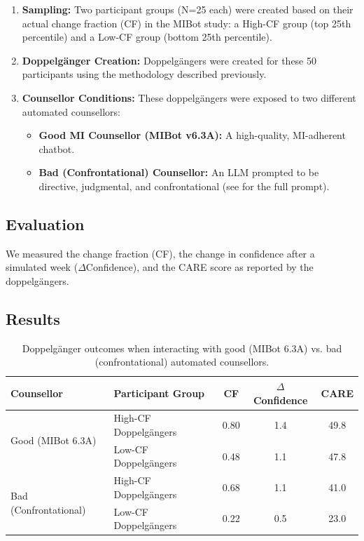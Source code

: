 \begin{enumerate}
    \item \textbf{Sampling:} Two participant groups (N=25 each) were created based on their actual change fraction (CF) in the MIBot study: a High-CF group (top 25th percentile) and a Low-CF group (bottom 25th percentile).

    \item \textbf{Doppelgänger Creation:} Doppelgängers were created for these 50 participants using the methodology described previously.
    
    \item \textbf{Counsellor Conditions:} These doppelgängers were exposed to two different automated counsellors:
    \begin{itemize}
        \item \textbf{Good MI Counsellor (MIBot v6.3A):} A high-quality, MI-adherent chatbot.
        
        \item \textbf{Bad (Confrontational) Counsellor:} An LLM prompted to be directive, judgmental, and confrontational (see  for the full prompt).
    \end{itemize}
\end{enumerate}

\subsection{Evaluation}
We measured the change fraction (CF), the change in confidence after a simulated week ($\Delta$Confidence), and the CARE score as reported by the doppelgängers.

\subsection{Results}

\begin{table}[ht!]
\centering
\begin{tabular}{@{}llccc@{}}
\toprule
\textbf{Counsellor} & \textbf{Participant Group} & \textbf{CF} & \textbf{$\Delta$Confidence} & \textbf{CARE} \\ \midrule
\multirow{2}{*}{Good (MIBot 6.3A)} & High-CF Doppelgängers & 0.80 & 1.4 & 49.8 \\
& Low-CF Doppelgängers & 0.48 & 1.1 & 47.8 \\ \midrule
\multirow{2}{*}{Bad (Confrontational)} & High-CF Doppelgängers & 0.68 & 1.1 & 41.0 \\
& Low-CF Doppelgängers & 0.22 & 0.5 & 23.0 \\ \bottomrule
\end{tabular}
\caption[Effect of counselling quality on doppelgängers' motivational language.]{Doppelgänger outcomes when interacting with good (MIBot 6.3A) vs. bad (confrontational) automated counsellors.}
\label{tab:good-vs-bad-counselling}
\end{table}

